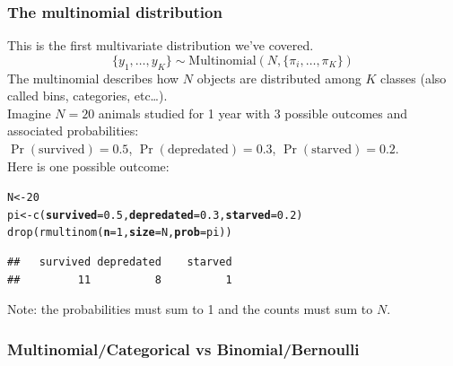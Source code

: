 \documentclass[color=usenames,dvipsnames]{beamer}\usepackage[]{graphicx}\usepackage[]{color}
\makeatletter
\newcommand{\hlnum}[1]{\textcolor[rgb]{0.69,0.494,0}{#1}}%
\newcommand{\hlstd}[1]{\textcolor[rgb]{0,0,0}{#1}}%
\newcommand{\hlkwb}[1]{\textcolor[rgb]{0,0.341,0.682}{#1}}%
\newcommand{\hlkwc}[1]{\textcolor[rgb]{0,0,0}{\textbf{#1}}}%
\newcommand{\hlkwd}[1]{\textcolor[rgb]{0.004,0.004,0.506}{#1}}%
\newenvironment{kframe}{%
 \def\at@end@of@kframe{}%
 \ifinner\ifhmode%
  \def\at@end@of@kframe{\end{minipage}}%
  \begin{minipage}{\columnwidth}%
 \fi\fi%
 \def\FrameCommand##1{\hskip\@totalleftmargin \hskip-\fboxsep
 \colorbox{shadecolor}{##1}\hskip-\fboxsep
     \hskip-\linewidth \hskip-\@totalleftmargin \hskip\columnwidth}%
 \MakeFramed {\advance\hsize-\width
   \@totalleftmargin\z@ \linewidth\hsize
   \@setminipage}}%
 {\par\unskip\endMakeFramed%
 \at@end@of@kframe}
\newenvironment{knitrout}{}{} %
\makeatother
\begin{document}
\begin{frame}[fragile]
  \frametitle{The multinomial distribution}
  \small
  This is the first multivariate distribution we've covered. \\
  \[
    \{y_{1}, \dots, y_{K}\}  \sim \mathrm{Multinomial}(N, \{\pi_i, \dots, \pi_K\})
  \]
  \pause
  The multinomial describes how $N$ objects are distributed among
  $K$ classes (also called bins, categories, etc\dots). \\
  \pause
  \vfill
  Imagine $N=20$ animals studied for 1 year with 3 possible outcomes
  and associated probabilities: \\
  $\Pr(\mathrm{survived})=0.5$, $\Pr(\mathrm{depredated})=0.3$, $\Pr(\mathrm{starved})=0.2$. \\
  \pause
  \vfill
  Here is one possible outcome:
  \vspace{-6pt}
\begin{knitrout}\footnotesize
{}\color{fgcolor}\begin{kframe}
\begin{alltt}
\hlstd{N} \hlkwb{<-} \hlnum{20}
\hlstd{pi} \hlkwb{<-} \hlkwd{c}\hlstd{(}\hlkwc{survived}\hlstd{=}\hlnum{0.5}\hlstd{,} \hlkwc{depredated}\hlstd{=}\hlnum{0.3}\hlstd{,} \hlkwc{starved}\hlstd{=}\hlnum{0.2}\hlstd{)}
\hlkwd{drop}\hlstd{(}\hlkwd{rmultinom}\hlstd{(}\hlkwc{n}\hlstd{=}\hlnum{1}\hlstd{,} \hlkwc{size}\hlstd{=N,} \hlkwc{prob}\hlstd{=pi))}
\end{alltt}
\begin{verbatim}
##   survived depredated    starved 
##         11          8          1
\end{verbatim}
\end{kframe}
\end{knitrout}
  \pause
  \vfill
  \centering
  Note: the probabilities must sum to 1 and the counts must sum to $N$. \\
\end{frame}



\begin{frame}[fragile]
  \frametitle{\normalsize Multinomial/Categorical vs Binomial/Bernoulli}
  \centering
   \\
\end{frame}
\end{document}
